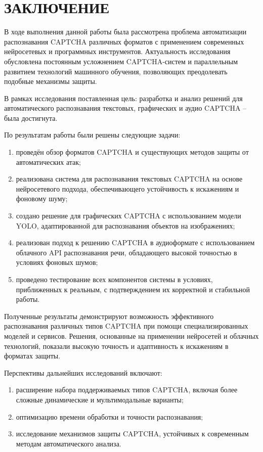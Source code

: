 \chapter*{ЗАКЛЮЧЕНИЕ}

В ходе выполнения данной работы была рассмотрена проблема автоматизации 
распознавания CAPTCHA различных форматов с применением современных нейросетевых и 
программных инструментов. Актуальность исследования обусловлена постоянным 
усложнением CAPTCHA-систем и параллельным развитием технологий машинного 
обучения, позволяющих преодолевать подобные механизмы защиты.

В рамках исследования поставленная цель: разработка и анализ решений для 
автоматического распознавания текстовых, графических и аудио CAPTCHA -- была 
достигнута.

По результатам работы были решены следующие задачи:

\begin{enumerate}
    \item проведён обзор форматов CAPTCHA и существующих методов защиты от 
    автоматических атак;
    \item реализована система для распознавания текстовых CAPTCHA на основе 
    нейросетевого подхода, обеспечивающего устойчивость к искажениям и фоновому 
    шуму;
    \item создано решение для графических CAPTCHA с использованием модели YOLO, 
    адаптированной для распознавания объектов на изображениях;
    \item реализован подход к решению CAPTCHA в аудиоформате с использованием 
    облачного API распознавания речи, обладающего высокой точностью в условиях 
    фоновых шумов;
    \item проведено тестирование всех компонентов системы в условиях, 
    приближенных к реальным, с подтверждением их корректной и стабильной работы.
\end{enumerate}

Полученные результаты демонстрируют возможность эффективного распознавания 
различных типов CAPTCHA при помощи специализированных моделей и сервисов. 
Решения, основанные на применении нейросетей и облачных технологий, показали 
высокую точность и адаптивность к искажениям в форматах защиты.

Перспективы дальнейших исследований включают:

\begin{enumerate}
    \item расширение набора поддерживаемых типов CAPTCHA, включая более сложные 
    динамические и мультимодальные варианты;
    \item оптимизацию времени обработки и точности распознавания;
    \item исследование механизмов защиты CAPTCHA, устойчивых к современным 
    методам автоматического анализа.
\end{enumerate}

